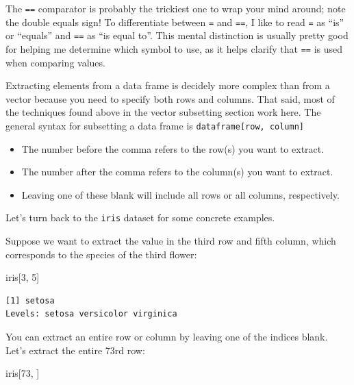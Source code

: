 \documentclass[
  letterpaper,
]{book}
\newenvironment{Shaded}{\begin{snugshade}}{\end{snugshade}}
\newcommand{\DecValTok}[1]{\textcolor[rgb]{0.68,0.00,0.00}{#1}}
\newcommand{\NormalTok}[1]{\textcolor[rgb]{0.00,0.23,0.31}{#1}}
\providecommand{\tightlist}{%
  \setlength{\itemsep}{0pt}\setlength{\parskip}{0pt}}\usepackage{longtable,booktabs,array}
\begin{document}
The \texttt{==} comparator is probably the trickiest one to wrap your
mind around; note the double equals sign! To differentiate between
\texttt{=} and \texttt{==}, I like to read \texttt{=} as ``is'' or
``equals'' and \texttt{==} as ``is equal to''. This mental distinction
is usually pretty good for helping me determine which symbol to use, as
it helps clarify that \texttt{==} is used when comparing values.

Extracting elements from a data frame is decidely more complex than from
a vector because you need to specify both rows and columns. That said,
most of the techniques found above in the vector subsetting section work
here. The general syntax for subsetting a data frame is
\texttt{dataframe{[}row,\ column{]}}

\begin{itemize}
\tightlist
\item
  The number before the comma refers to the row(s) you want to extract.
\item
  The number after the comma refers to the column(s) you want to
  extract.
\item
  Leaving one of these blank will include all rows or all columns,
  respectively.
\end{itemize}

Let's turn back to the \texttt{iris} dataset for some concrete examples.

Suppose we want to extract the value in the third row and fifth column,
which corresponds to the species of the third flower:

\begin{Shaded}
\begin{Highlighting}[]
\NormalTok{iris[}\DecValTok{3}\NormalTok{, }\DecValTok{5}\NormalTok{]}
\end{Highlighting}
\end{Shaded}

\begin{verbatim}
[1] setosa
Levels: setosa versicolor virginica
\end{verbatim}

You can extract an entire row or column by leaving one of the indices
blank. Let's extract the entire 73rd row:

\begin{Shaded}
\begin{Highlighting}[]
\NormalTok{iris[}\DecValTok{73}\NormalTok{, ]}
\end{Highlighting}
\end{Shaded}
\end{document}
